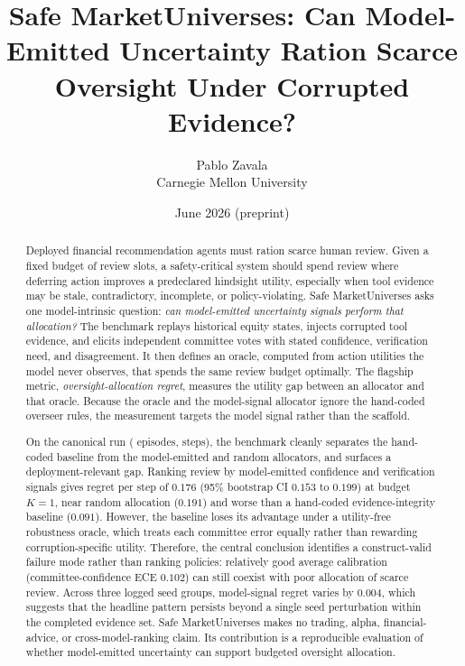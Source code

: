 \documentclass[10pt,twocolumn]{article}
\title{\vspace{-0.35in}Safe MarketUniverses: Can Model-Emitted Uncertainty Ration Scarce Oversight Under Corrupted Evidence?}
\author{Pablo Zavala\\Carnegie Mellon University}
\date{June 2026 (preprint)}
\begin{document}
\raggedbottom
\maketitle

\begin{abstract}
Deployed financial recommendation agents must ration scarce human review. Given a fixed budget of review slots, a safety-critical system should spend review where deferring action improves a predeclared hindsight utility, especially when tool evidence may be stale, contradictory, incomplete, or policy-violating. Safe MarketUniverses asks one model-intrinsic question: \emph{can model-emitted uncertainty signals perform that allocation?} The benchmark replays historical equity states, injects corrupted tool evidence, and elicits independent committee votes with stated confidence, verification need, and disagreement. It then defines an oracle, computed from action utilities the model never observes, that spends the same review budget optimally. The flagship metric, \emph{oversight-allocation regret}, measures the utility gap between an allocator and that oracle. Because the oracle and the model-signal allocator ignore the hand-coded overseer rules, the measurement targets the model signal rather than the scaffold.

On the canonical run (\SMUEpisodes{} episodes, \SMUSteps{} steps), the benchmark cleanly separates the hand-coded baseline from the model-emitted and random allocators, and surfaces a deployment-relevant gap. Ranking review by model-emitted confidence and verification signals gives regret per step of \(0.176\) (95\% bootstrap CI \(0.153\text{ to }0.199\)) at budget \(K{=}1\), near random allocation (\(0.191\)) and worse than a hand-coded evidence-integrity baseline (\(0.091\)). However, the baseline loses its advantage under a utility-free robustness oracle, which treats each committee error equally rather than rewarding corruption-specific utility. Therefore, the central conclusion identifies a construct-valid failure mode rather than ranking policies: relatively good average calibration (committee-confidence ECE \(0.102\)) can still coexist with poor allocation of scarce review. Across three logged seed groups, model-signal regret varies by \(0.004\), which suggests that the headline pattern persists beyond a single seed perturbation within the completed evidence set. Safe MarketUniverses makes no trading, alpha, financial-advice, or cross-model-ranking claim. Its contribution is a reproducible evaluation of whether model-emitted uncertainty can support budgeted oversight allocation.
\end{abstract}
\end{document}
